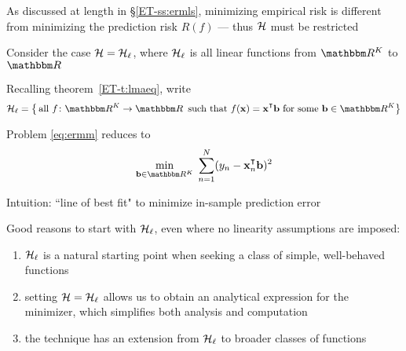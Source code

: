 \begin{frame}

    \vspace{2em}
    As discussed at length in \S\ref{ET-ss:ermls},
    minimizing empirical risk is different from minimizing the prediction risk
    $R(f)$ --- thus $\mathcal H$ must be
    restricted 
    
    \vspace{.7em}
    Consider the case $\mathcal H = \mathcal{H}_{\ell}$, where $\mathcal{H}_{\ell}$ is all
    linear functions from $\RR^K$ to $\RR$
    
    Recalling theorem~\ref{ET-t:lmaeq}, write
    \begin{equation*}
        \label{eq:allaff2}
        \llL = 
        \left\{ \, \text{all } f \colon \RR^K \to \RR \, 
            \text{ such that }
            f(\boldx) = \boldx^\T \boldb \text{ for some } \boldb \in \RR^K 
        \right\}
    \end{equation*}
    
    
    Problem \eqref{eq:ermm} reduces to 
    \begin{equation}
        \label{eq:olslq}
            \min_{\boldb \in \RR^K} \;
            \sum_{n=1}^N (y_n - \boldx_n^\T \boldb)^2
    \end{equation}
    
\end{frame}

\begin{frame}

    \vspace{2em}
    Intuition: ``line of best fit" to minimize in-sample prediction error
    
    \vspace{.7em}
    Good reasons to start with $\mathcal{H}_{\ell}$, even where no linearity
    assumptions are imposed:
    
    \begin{enumerate}
        \item $\mathcal{H}_{\ell}$ is a natural starting point when
            seeking a class of simple, well-behaved functions
        \item setting $\mathcal H
            = \mathcal{H}_{\ell}$ allows us to obtain an analytical expression for the minimizer, 
            which simplifies both analysis and computation
        \item the technique has an extension from
            $\mathcal{H}_{\ell}$ to broader classes of functions
    \end{enumerate}

\end{frame}

